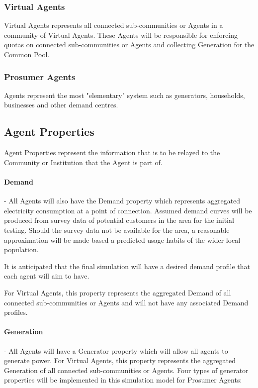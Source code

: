 \subsubsection*{Virtual Agents}
Virtual Agents represents all connected sub-communities or Agents in a community of Virtual Agents. These Agents will be responsible for enforcing quotas on connected sub-communities or Agents and collecting Generation for the Common Pool. 

\subsubsection*{Prosumer Agents}
Agents represent the most "elementary" system such as generators, households, businesses and other demand centres.

\subsection*{Agent Properties}
Agent Properties represent the information that is to be relayed to the Community or Institution that the Agent is part of.
\paragraph*{Demand} - All Agents will also have the Demand property which represents aggregated electricity consumption at a point of connection. Assumed demand curves will be produced from survey data of potential customers in the area for the initial testing. Should the survey data not be available for the area, a reasonable approximation will be made based a predicted usage habits of the wider local population.

It is anticipated that the final simulation will have a desired demand profile that each agent will aim to have. 

For Virtual Agents, this property represents the aggregated Demand of all connected sub-communities or Agents and will not have any associated Demand profiles.

\paragraph*{Generation} - All Agents will have a Generator property which will allow all agents to generate power. For Virtual Agents, this property represents the aggregated Generation of all connected sub-communities or Agents. Four types of generator properties will be implemented in this simulation model for Prosumer Agents: 

